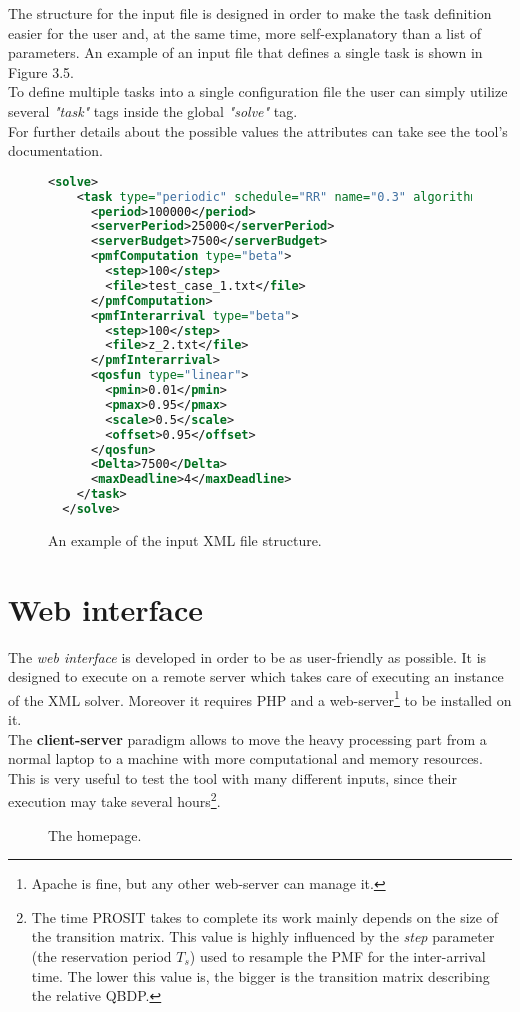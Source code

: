 The structure for the input file is designed in order to make the task definition easier for the user and, at the same time, more self-explanatory than a list of parameters. An example of an input file that defines a single task is shown in Figure 3.5.\\
To define multiple tasks into a single configuration file the user can simply utilize several \emph{"task"} tags inside the global \emph{"solve"} tag.\\ 
For further details about the possible values the attributes can take see the tool's documentation.  
\begin{figure}[H]
\begin{lstlisting}[frame=bt, language=XML, numbers=none]
  <solve>
    <task type="periodic" schedule="RR" name="0.3" algorithm="cyclic">
      <period>100000</period>
      <serverPeriod>25000</serverPeriod>
      <serverBudget>7500</serverBudget>
      <pmfComputation type="beta">
        <step>100</step>
        <file>test_case_1.txt</file>
      </pmfComputation>
      <pmfInterarrival type="beta">
        <step>100</step>
        <file>z_2.txt</file>
      </pmfInterarrival>
      <qosfun type="linear">
        <pmin>0.01</pmin>
        <pmax>0.95</pmax>
        <scale>0.5</scale>
        <offset>0.95</offset>
      </qosfun>
      <Delta>7500</Delta>
      <maxDeadline>4</maxDeadline>
    </task>
  </solve>
\end{lstlisting}
\caption{An example of the input XML file structure.}
\end{figure}

\section{Web interface}
The \emph{web interface} is developed in order to be as user-friendly as possible. It is designed to execute on a remote server which takes care of executing an instance of the XML solver. Moreover it requires PHP and a web-server\footnote{Apache is fine, but any other web-server can manage it.} to be installed on it.\\
The \textbf{client-server} paradigm allows to move the heavy processing part from a normal laptop to a machine with more computational and memory resources. This is very useful to test the tool with many different inputs, since their execution may take several hours\footnote{The time PROSIT takes to complete its work mainly depends on the size of the transition matrix. This value is highly influenced by the \emph{step} parameter (the reservation period \( T_{s} \)) used to resample the PMF for the inter-arrival time. The lower this value is, the bigger is the transition matrix describing the relative QBDP.}.
\begin{figure}[H]
  \caption{The homepage.}
  \label{index}
\end{figure}

